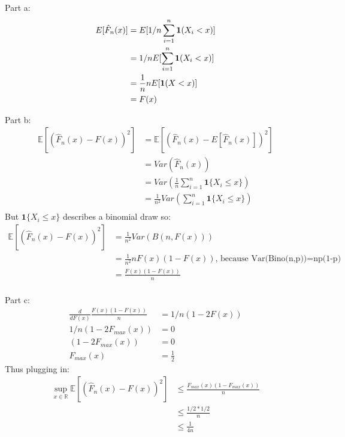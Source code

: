 \documentclass{article}
\newcommand{\field}[1]{\mathbb{#1}}
\newcommand{\1}{\mathbf{1}}
\newcommand{\E}{\mathbb{E}}
\newcommand{\R}{\field{R}} %
\begin{document}
Part a:
\begin{align}
    E[\Hat{F}_n(x)] &= E[1/n \sum_{i=1}^n \1 (X_i < x)] \\
    &= 1/n E[\sum_{i=1}^n \1 (X_i < x)] \\
    &= \frac{1}{n} n E[ \1 (X < x)] \\
    &= F(x) \\
\end{align}


Part b:\\
\begin{align}
    \E[ ( \widehat{F}_n(x) - F(x) )^2 ] & = \E[ ( \widehat{F}_n(x) - E[\widehat{F}_n(x)] )^2 ] \\
    & = Var(\widehat{F}_n(x)) \\
    & = Var( \frac{1}{n} \sum_{i=1}^n \1\{X_i \leq x\} ) \\
    & = \frac{1}{n^2} Var( \sum_{i=1}^n \1\{X_i \leq x\} ) \\
\end{align}
But $\1\{X_i \leq x\}$ describes a binomial draw so:
\begin{align}
   \E[ ( \widehat{F}_n(x) - F(x) )^2 ] & = \frac{1}{n^2} Var( B(n, F(x)) ) \\
    & = \frac{1}{n^2} n F(x)(1-F(x)) \text{, because Var(Bino(n,p))=np(1-p) } \\
    & = \frac{F(x)(1-F(x))}{n}  \\
\end{align}


Part c:\\
\begin{align}
    \frac{d}{dF(x)} \frac{F(x)(1-F(x))}{n} & = 1/n(1 - 2F(x)) \\
     1/n(1 - 2F_{max}(x)) & = 0 \\
    (1 - 2F_{max}(x)) & = 0 \\
    F_{max}(x) & = \frac{1}{2} 
\end{align}
Thus plugging in:
\begin{align}
    \displaystyle\sup_{x \in \R} \E[ ( \widehat{F}_n(x) - F(x) )^2 ] & \leq \frac{F_{max}(x)(1-F_{max}(x))}{n}\\
    & \leq \frac{1/2 *1/2}{n} \\
    & \leq \frac{1}{4n}
\end{align}






\newpage
\end{document}
